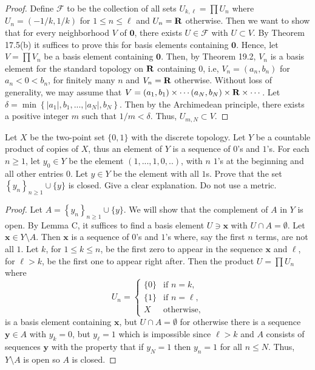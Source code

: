 \begin{proof}
Define $\mathcal{F}$ to be the collection of all sets
$U_{k,\ell}=\prod U_n$ where $U_n=(-1/k,1/k)$ for $1\leq
n\leq\ell$ and $U_n=\mathbf{R}$ otherwise. Then we want to show that for
every neighborhood $V$ of $\mathbf{0}$, there exists
$U\in\mathcal{F}$ with $U\subset V$. By Theorem 17.5(b) it
suffices to prove this for basis elements containing
$\mathbf{0}$. Hence, let $V=\prod V_n$ be a basis element
containing $\mathbf{0}$. Then, by Theorem 19.2, $V_n$ is a basis
element for the standard topology on $\mathbf{R}$ containing $0$, i.e,
$V_n=(a_n,b_n)$ for $a_n<0<b_n$, for finitely many $n$ and
$V_n=\mathbf{R}$ otherwise. Without loss of generality, we may assume
that $V=(a_1,b_1)\times\cdots(a_N,b_N)\times\mathbf{R}\times\cdots$. Let
$\delta=\min\left\{|a_1|,b_1,...,|a_N|,b_N\right\}$. Then by the
Archimedean principle, there exists a positive integer $m$ such
that $1/m<\delta$. Thus, $U_{m,N}\subset V$.
\end{proof}
\begin{problem}
Let $X$ be the two-point set $\{0,1\}$ with the discrete
topology. Let $Y$ be a countable product of copies of $X$, thus
an element of $Y$ is a sequence of $0$'s and $1$'s. For each
$n\geq 1$, let $y_0\in Y$ be the element $(1,...,1,0,..)$, with
$n$ $1$'s at the beginning and all other entries $0$. Let $y\in
Y$ be the element with all $1$s. Prove that the set
$\left\{y_n\right\}_{n\geq 1}\cup\{y\}$ is closed. Give a clear
explanation. Do not use a metric.
\end{problem}
\begin{proof}
Let $A=\left\{y_n\right\}_{n\geq 1}\cup\{y\}$. We will show that
the complement of $A$ in $Y$ is open. By Lemma C, it suffices to
find a basis element $U\ni\mathbf{x}$ with $U\cap
A=\emptyset$. Let $\mathbf{x}\in  Y\setminus A$. Then
$\mathbf{x}$ is a sequence of $0$'s and $1$'s where, say the
first $n$ terms, are not all $1$. Let $k$, for $1\leq k\leq n$,
be the first zero to appear in the sequence $\mathbf{x}$ and
$\ell$, for $\ell>k$, be the first one to appear right
after. Then the product $U=\prod U_n$ where
\[
U_n=
\begin{cases}
\{0\}&\text{if $n=k$,}\\
\{1\}&\text{if $n=\ell$,}\\
X&\text{otherwise},
\end{cases}
\]
is a basis element containing $\mathbf{x}$, but $U\cap
A=\emptyset$ for otherwise there is a sequence $\mathbf{y}\in A$
with $y_k=0$, but $y_\ell=1$ which is impossible since $\ell>k$
and $A$ consists of sequences $\mathbf{y}$ with the property that
if $y_N=1$ then $y_n=1$ for all $n\leq N$. Thus, $Y\setminus A$
is open so $A$ is closed.
\end{proof}
